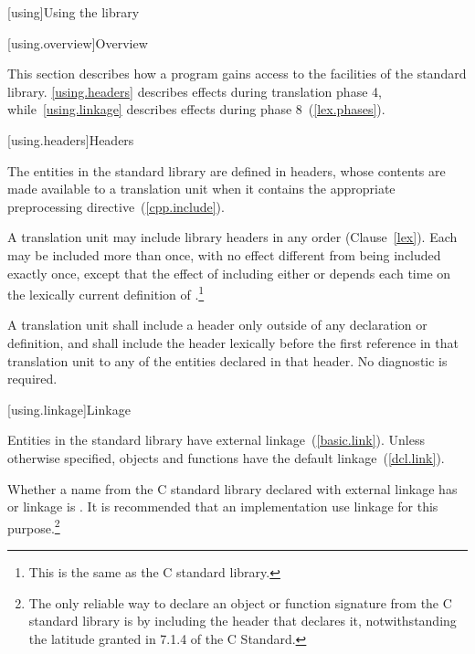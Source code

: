 [using]{Using the library}

[using.overview]{Overview}

\pnum
This section describes how a \Cpp program gains access to the facilities of the
\Cpp standard library. \ref{using.headers} describes effects during translation
phase 4, while~\ref{using.linkage} describes effects during phase
8~(\ref{lex.phases}).

[using.headers]{Headers}

\pnum
The entities in the \Cpp standard library are defined in headers,
whose contents are made available to a translation unit when it contains the appropriate
%
preprocessing directive~(\ref{cpp.include}).%
%

\pnum
A translation unit may include library headers in any order (Clause~\ref{lex}).
%
Each may be included more than once, with no effect different from
being included exactly once, except that the effect of including either
or
depends each time on the lexically
%
%
%
%
current definition of
%
%
.\footnote{This is the same as the C standard library.}

\pnum
A translation unit shall include a header only outside of any
%
declaration or definition, and shall include the header lexically
before the first reference in that translation unit to any of the entities
declared in that header. No diagnostic is required.

[using.linkage]{Linkage}

\pnum
Entities in the \Cpp standard library have external linkage~(\ref{basic.link}).
Unless otherwise specified, objects and functions have the default
linkage~(\ref{dcl.link}).

\pnum
{}%
Whether a name from the C standard library declared with
external linkage has
%
%
%
or
%
linkage is . It is recommended that an
implementation use
linkage for this purpose.\footnote{The only reliable way to declare an object or
function signature from the C standard library is by including the header that
declares it, notwithstanding the latitude granted in 7.1.4 of the C
Standard.}

